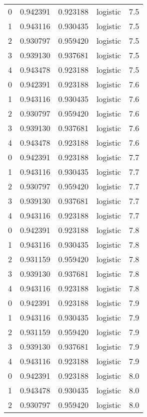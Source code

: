 \begin{tabular}{rrrlr}
     0 & 0.942391 & 0.923188 & logistic &        7.5 \\
     1 & 0.943116 & 0.930435 & logistic &        7.5 \\
     2 & 0.930797 & 0.959420 & logistic &        7.5 \\
     3 & 0.939130 & 0.937681 & logistic &        7.5 \\
     4 & 0.943478 & 0.923188 & logistic &        7.5 \\
     0 & 0.942391 & 0.923188 & logistic &        7.6 \\
     1 & 0.943116 & 0.930435 & logistic &        7.6 \\
     2 & 0.930797 & 0.959420 & logistic &        7.6 \\
     3 & 0.939130 & 0.937681 & logistic &        7.6 \\
     4 & 0.943478 & 0.923188 & logistic &        7.6 \\
     0 & 0.942391 & 0.923188 & logistic &        7.7 \\
     1 & 0.943116 & 0.930435 & logistic &        7.7 \\
     2 & 0.930797 & 0.959420 & logistic &        7.7 \\
     3 & 0.939130 & 0.937681 & logistic &        7.7 \\
     4 & 0.943116 & 0.923188 & logistic &        7.7 \\
     0 & 0.942391 & 0.923188 & logistic &        7.8 \\
     1 & 0.943116 & 0.930435 & logistic &        7.8 \\
     2 & 0.931159 & 0.959420 & logistic &        7.8 \\
     3 & 0.939130 & 0.937681 & logistic &        7.8 \\
     4 & 0.943116 & 0.923188 & logistic &        7.8 \\
     0 & 0.942391 & 0.923188 & logistic &        7.9 \\
     1 & 0.943116 & 0.930435 & logistic &        7.9 \\
     2 & 0.931159 & 0.959420 & logistic &        7.9 \\
     3 & 0.939130 & 0.937681 & logistic &        7.9 \\
     4 & 0.943116 & 0.923188 & logistic &        7.9 \\
     0 & 0.942391 & 0.923188 & logistic &        8.0 \\
     1 & 0.943478 & 0.930435 & logistic &        8.0 \\
     2 & 0.930797 & 0.959420 & logistic &        8.0 \\

\end{tabular}
